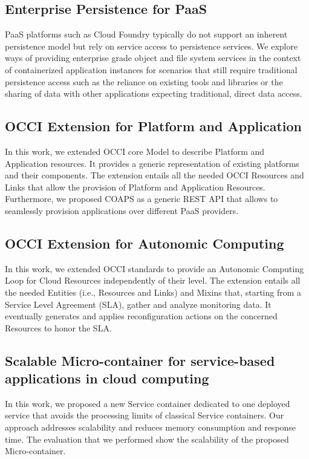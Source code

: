 \documentclass[11pt,a4paper,sans]{moderncv}   %
\begin{document}
\subsection{Enterprise Persistence for PaaS}
PaaS platforms such as Cloud Foundry typically do not support an inherent persistence model but rely on service access to persistence services. We 
explore ways of providing enterprise grade object and file system services in the context of containerized application instances for scenarios that 
still require traditional persistence access such as the reliance on existing tools and libraries or the sharing of data with other applications 
expecting traditional, direct data access.
\subsection{OCCI Extension for Platform and Application}
In this work, we extended OCCI core Model to describe Platform and Application resources. It provides a generic representation of existing 
platforms and their components. The extension entails all the needed OCCI Resources and Links that allow the provision of Platform and Application Resources. Furthermore, we 
proposed COAPS as a generic REST API that allows to seamlessly provision applications over different PaaS providers.
\subsection{OCCI Extension for Autonomic Computing}
 In this work, we extended OCCI standards to provide an Autonomic Computing Loop for Cloud Resources independently of their level. The extension entails all the needed Entities 
(i.e., Resources and Links) and Mixins that, starting from a Service Level Agreement (SLA), gather and analyze monitoring data. It eventually generates and applies reconfiguration 
actions on the concerned Resources to honor the SLA.
\subsection{Scalable Micro-container for service-based applications in cloud computing}
In this work, we proposed a new Service container dedicated to one deployed service that avoids the processing limits of classical Service containers. Our approach addresses 
scalability and reduces memory consumption and response time. The evaluation that we performed show the scalability of the proposed Micro-container.
\end{document}
